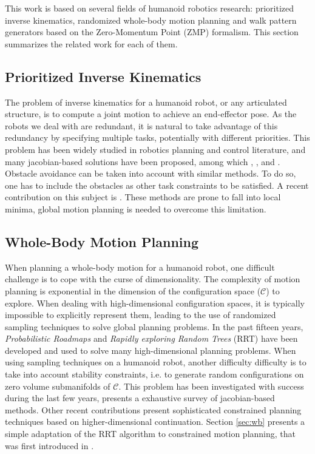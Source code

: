 \documentclass{article}
\begin{document}
This work is based on several fields of humanoid robotics
research: prioritized inverse kinematics, randomized  whole-body  motion
planning and walk pattern generators based on the Zero-Momentum
Point (ZMP) formalism. This section summarizes the related work for each of them.

\subsection{Prioritized Inverse Kinematics}

The problem of inverse kinematics for a humanoid robot, or any articulated
structure, is to compute a joint motion to achieve an end-effector pose. As the
robots we deal with are redundant, it is natural to take advantage of
this redundancy by specifying multiple tasks, potentially with
different priorities. This problem has been widely studied in robotics
planning and control literature, and many jacobian-based solutions have been
proposed, among which 
\cite{nakamura1986iks}, \cite{siciliano1991gfm},
\cite{baerlocher1998tpf} and \cite{khatib2004wbd}.
Obstacle avoidance can be taken into account with similar methods. To
do so, one has to include the obstacles as other task constraints to
be satisfied. A recent  contribution on this subject is \cite{kanehiro2008lca}.
These methods are prone to fall into local minima, global motion 
planning is needed to overcome this limitation.

\subsection{Whole-Body Motion Planning}

When  planning a  whole-body motion  for a  humanoid robot, one difficult
challenge is to cope with  the curse of dimensionality. The complexity
of   motion  planning  is   exponential  in   the  dimension   of  the
configuration  space ($\mathcal{C}$)  to explore.  When  dealing with
high-dimensional configuration  spaces, it is  typically impossible to
explicitly represent  them, leading to the use  of randomized sampling
techniques  to solve  global planning  problems. In  the  past fifteen
years,  \textit{Probabilistic Roadmaps} \cite{kavraki1996prp} and  
\textit{Rapidly exploring Random  Trees} (RRT) 
\cite{kuffner00rrtconnect}  have been  developed and  used to  solve many
high-dimensional   planning  problems.
When  using  sampling  techniques  on  a humanoid  robot,  another difficulty
difficulty  is to  take into  account stability  constraints,  i.e. to
generate  random  configurations   on  zero  volume  submanifolds  of
$\mathcal{C}$. This problem has been investigated with success during
the last few years, \cite{Berenson15032011} presents a exhaustive survey
of jacobian-based methods. Other recent contributions \cite{porta2012randomized}
present sophisticated constrained planning techniques based on higher-dimensional
continuation. Section \ref{sec:wb} presents a simple adaptation
of the RRT algorithm to constrained motion planning, that was first
introduced in \cite{dalibard09}.
\end{document}
